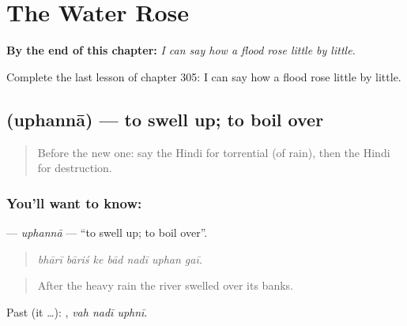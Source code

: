 
\chapter{The Water Rose}
\label{ch:hi-the-water-rose}

\begin{chapteropening}
\textbf{By the end of this chapter:} \emph{I can say how a flood rose little by little.}

Complete the last lesson of chapter 305: I can say how a flood rose little by little.
\end{chapteropening}

\section[\texorpdfstring{\hi{उफनना} (uphannā)}{उफनना (uphannā)}]{ (uphannā) — to swell up; to boil over}

\label{lesson:HI-C305-uphanna}



\begin{quote}
Before the new one: say the Hindi for torrential (of rain), then the Hindi for destruction.
\end{quote}

\subsection*{You'll want to know: }
\textbf{} — \emph{uphannā} — \textquotedblleft{}to swell up; to boil over\textquotedblright{}.

\begin{quote}
      
\end{quote}

\begin{quote}
\emph{bhārī bāriś ke bād nadī uphan gaī.}
\end{quote}

\begin{quote}
After the heavy rain the river swelled over its banks.
\end{quote}

Past (it …):   , \emph{vah nadī uphnī}.

